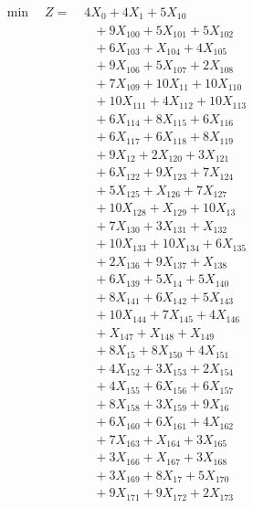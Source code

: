 \documentclass[a4paper,10pt]{article}
\begin{document}
\allowdisplaybreaks
{\small
\begin{align}
\min \quad Z = &\; 4X_{0} + 4X_{1} + 5X_{10} \\[0.5ex]
&\quad  + 9X_{100} + 5X_{101} + 5X_{102} \\[0.5ex]
&\quad  + 6X_{103} + X_{104} + 4X_{105} \\[0.5ex]
&\quad  + 9X_{106} + 5X_{107} + 2X_{108} \\[0.5ex]
&\quad  + 7X_{109} + 10X_{11} + 10X_{110} \\[0.5ex]
&\quad  + 10X_{111} + 4X_{112} + 10X_{113} \\[0.5ex]
&\quad  + 6X_{114} + 8X_{115} + 6X_{116} \\[0.5ex]
&\quad  + 6X_{117} + 6X_{118} + 8X_{119} \\[0.5ex]
&\quad  + 9X_{12} + 2X_{120} + 3X_{121} \\[0.5ex]
&\quad  + 6X_{122} + 9X_{123} + 7X_{124} \\[0.5ex]
&\quad  + 5X_{125} + X_{126} + 7X_{127} \\[0.5ex]
&\quad  + 10X_{128} + X_{129} + 10X_{13} \\[0.5ex]
&\quad  + 7X_{130} + 3X_{131} + X_{132} \\[0.5ex]
&\quad  + 10X_{133} + 10X_{134} + 6X_{135} \\[0.5ex]
&\quad  + 2X_{136} + 9X_{137} + X_{138} \\[0.5ex]
&\quad  + 6X_{139} + 5X_{14} + 5X_{140} \\[0.5ex]
&\quad  + 8X_{141} + 6X_{142} + 5X_{143} \\[0.5ex]
&\quad  + 10X_{144} + 7X_{145} + 4X_{146} \\[0.5ex]
&\quad  + X_{147} + X_{148} + X_{149} \\[0.5ex]
&\quad  + 8X_{15} + 8X_{150} + 4X_{151} \\[0.5ex]
&\quad  + 4X_{152} + 3X_{153} + 2X_{154} \\[0.5ex]
&\quad  + 4X_{155} + 6X_{156} + 6X_{157} \\[0.5ex]
&\quad  + 8X_{158} + 3X_{159} + 9X_{16} \\[0.5ex]
&\quad  + 6X_{160} + 6X_{161} + 4X_{162} \\[0.5ex]
&\quad  + 7X_{163} + X_{164} + 3X_{165} \\[0.5ex]
&\quad  + 3X_{166} + X_{167} + 3X_{168} \\[0.5ex]
&\quad  + 3X_{169} + 8X_{17} + 5X_{170} \\[0.5ex]
&\quad  + 9X_{171} + 9X_{172} + 2X_{173} \\[0.5ex]

\end{align}}
\end{document}
